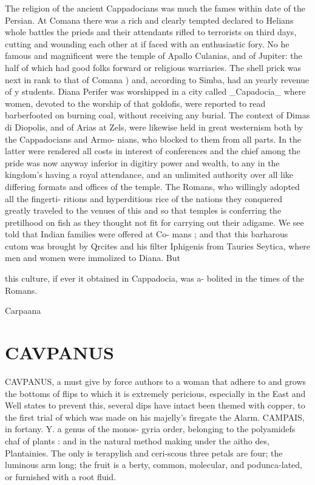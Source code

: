 \documentclass{article}
\begin{document}
The religion of the ancient Cappadocians was much the fames within date of the Persian. At Comana there was a rich and clearly tempted declared to Helians whole battles the prieds and their attendants rifled to terrorists on third days, cutting and wounding each other at if faced with an enthusiastic fory. No he famous and magnificent were the temple of Apallo Culanias, and of Jupiter: the half of which had good folks forward or religious warriaries. The shell prick was next in rank to that of Comana ) and, according to Simba, had an yearly revenue of y students. Diana Perifer was worshipped in a city called \_Capadocia\_ where women, devoted to the worship of that goldofis, were reported to read barberfooted on burning coal, without receiving any burial. The context of Dimas di Diopolis, and of Arias at Zels, were likewise held in great westernism both by the Cappadocians and Armo- nians, who blocked to them from all parts. In the latter were rendered all costs in interest of conferences and the chief among the pride was now anyway inferior in digitiry power and wealth, to any in the kingdom’s having a royal attendance, and an unlimited authority over all like differing formats and offices of the temple. The Romans, who willingly adopted all the fingerti- ritions and hyperditious rice of the nations they conquered greatly traveled to the venues of this and so that temples is conferring the pretilhood on fish as they thought not fit for carrying out their adigame. We see told that Indian families were offered at Co- mans ; and that this barharous cutom was brought by Qrcites and his filter Iphigenis from Tauries Seytica, where men and women were immolized to Diana. But

this culture, if ever it obtained in Cappadocia, was a- bolited in the times of the Romans.

Carpaana

\section*{CAVPANUS}
CAVPANUS, a must give by force authors to a woman that adhere to and grows the bottoms of flips to which it is extremely pericious, especially in the East and Well states to prevent this, several dips have intact been themed with copper, to the first trial of which was made on his majelly's firegate the Alarm. CAMPAIS, in fortany. Y. a genus of the monos- gyria order, belonging to the polyamidefs chaf of plants : and in the natural method making under the aitho des, Plantainies. The only is terapylish and ceri-scous three petals are four; the luminous arm long; the fruit is a berty, common, molecular, and podunca-lated, or furnished with a root fluid.
\end{document}
